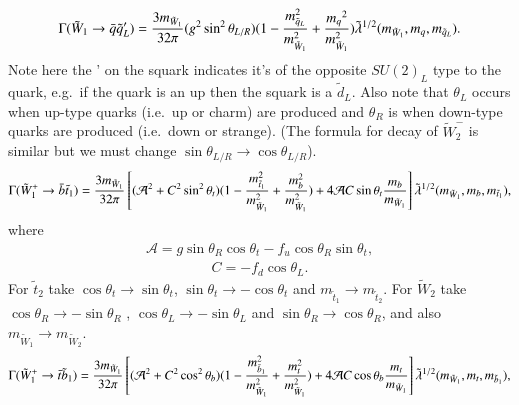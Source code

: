 \documentclass[final,3p,times]{elsarticle}
\begin{document}
\begin{equation}\label{ch1qqL}
\begin{aligned}
\Gamma (\tilde{W}_1 \rightarrow \bar{q} \tilde{q}_L') = {3 m_{\tilde{W}_1} \over 32\pi} (g^2\sin^2\theta_{L/R}) (1- {m_{\tilde{q}_L}^2 \over m_{\tilde{W}_1}^2} + {{m_q}^2 \over m_{\tilde{W}_1}^2 }) \tilde{\lambda}^{1/2}(m_{\tilde{W}_1},m_q, m_{\tilde{q}_L}).
\end{aligned}
\end{equation} 
Note here the ' on the squark indicates it's of the opposite $SU(2)_L$ type to
the quark, e.g.\ if the quark 
is an up then the squark is a $\tilde{d}_L$. Also note that $\theta_L$ occurs when up-type quarks (i.e.\ up or charm)
are produced and $\theta_R$ is when down-type quarks are produced (i.e.\ down or strange).
(The formula for decay of $\tilde{W}_{2}^{-}$ is similar but we must change $\sin \theta_{L/R} \rightarrow \cos\theta_{L/R}$).
\begin{equation}\label{ch1bst1}
\begin{aligned}
\Gamma (\tilde{W}_1^+ \rightarrow \bar{b} \tilde{t}_{1}) = {3 m_{\tilde{W}_1} \over 32\pi} \left[(\mathcal{A}^2 + C^2 \sin^2\theta_t) (1 - {m_{\tilde{t}_1}^2 \over {m_{\tilde{W}_1}^2}} + {m_{b}^2 \over {m_{\tilde{W}_1}^2} }) + 4\mathcal{A}C\sin\theta_t {m_b \over m_{\tilde{W}_1}}\right] \tilde{\lambda}^{1/2}(m_{\tilde{W}_1},m_b, m_{\tilde{t}_1}),
\end{aligned}
\end{equation} 
where
\begin{equation}
\begin{aligned}
\mathcal{A} = g\sin\theta_R\cos\theta_t - f_u \cos\theta_R\sin\theta_t,
\end{aligned}
\end{equation}
\begin{equation}
\begin{aligned}
C = -f_d \cos\theta_L.
\end{aligned}
\end{equation}
For $\tilde{t}_2$ take $\cos\theta_t \rightarrow \sin\theta_t$, $\sin\theta_t \rightarrow -\cos\theta_t$ and $m_{\tilde{t}_1} \rightarrow m_{\tilde{t}_2}$.
For $\tilde{W}_2$ take $\cos\theta_R \rightarrow -\sin\theta_R$ , $\cos\theta_L \rightarrow -\sin\theta_L$ and $\sin\theta_R \rightarrow \cos\theta_R$, and also $m_{\tilde{W}_{1}} \rightarrow m_{\tilde{W}_{2}}$.
\begin{equation}\label{ch1tsb1}
\begin{aligned}
\Gamma (\tilde{W}_1^+ \rightarrow \bar{t} \tilde{b}_{1}) = {3 m_{\tilde{W}_1} \over 32\pi} \left[(\mathcal{A}^2 + C^2 \cos^2\theta_b) (1 - {m_{\tilde{b}_1}^2 \over {m_{\tilde{W}_1}^2}} + {m_{t}^2 \over {m_{\tilde{W}_1}^2} }) + 4\mathcal{A}C\cos\theta_b {m_t \over m_{\tilde{W}_1}}\right] \tilde{\lambda}^{1/2}(m_{\tilde{W}_1},m_t, m_{\tilde{b}_1}),
\end{aligned}
\end{equation} 
\end{document}
